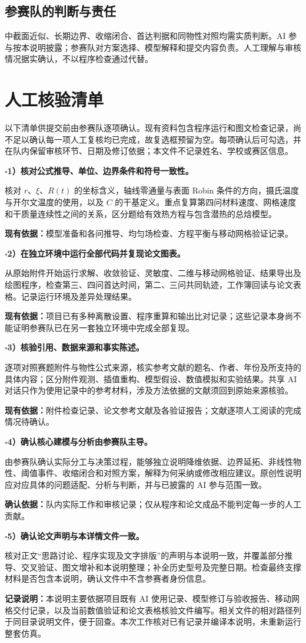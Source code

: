 \documentclass[withoutpreface,bwprint]{commons/cumcmthesis}
\newcommand{\checkitem}[1]{\par\addvspace{0.7em}\noindent$\square$\quad\textbf{#1}\par\nobreak\vspace{0.25em}\nobreak}
\begin{document}
\subsection{参赛队的判断与责任}
中截面近似、长期边界、收缩闭合、首达判据和同物性对照均需实质判断。AI 参与按本说明披露；参赛队对方案选择、模型解释和提交内容负责。人工理解与审核情况据实确认，不以程序检查通过代替。

\section{人工核验清单}
以下清单供提交前由参赛队逐项确认。现有资料包含程序运行和图文检查记录，尚不足以确认每一项人工复核均已完成，故复选框预留为空。每项确认后可勾选，并在队内保留审核环节、日期及修订依据；本文件不记录姓名、学校或赛区信息。

\checkitem{1）核对公式推导、单位、边界条件和符号一致性。}
核对 $r$、$\xi$、$R(t)$ 的坐标含义，轴线零通量与表面 Robin 条件的方向，摄氏温度与开尔文温度的使用，以及 $C$ 的干基定义。重点复算第四问材料速度、网格速度和干质量连续性之间的关系，区分题给有效热方程与包含潜热的总焓模型。

\textbf{现有依据：}模型准备和各问推导、均匀场检查、方程平衡与移动网格验证记录。

\checkitem{2）在独立环境中运行全部代码并复现论文图表。}
从原始附件开始运行求解、收敛验证、灵敏度、二维与移动网格验证、结果导出及绘图程序，检查第三、四问首达时间，第二、三问共同轨迹，工作簿回读与论文表格。记录运行环境及差异处理结果。

\textbf{现有依据：}项目已有多种离散设置、程序重算和输出比对记录；这些记录本身尚不能证明参赛队已在另一套独立环境中完成全部复现。

\checkitem{3）核验引用、数据来源和事实陈述。}
逐项对照赛题附件与物性公式来源，核实参考文献的题名、作者、年份及所支持的具体内容；区分附件观测、插值重构、模型假设、数值模拟和实验结果。共享 AI 对话只作为使用记录中的参考材料，涉及方法依据的文献须回到原始来源核验。

\textbf{现有依据：}附件检查记录、论文参考文献及各验证报告；文献逐项人工阅读的完成情况待确认。

\checkitem{4）确认核心建模与分析由参赛队主导。}
由参赛队确认实际分工与决策过程，能够独立说明降维依据、边界延拓、非线性物性、阈值事件、收缩闭合和对照方案，解释为何采纳或修改相应建议。原创性说明应对应具体的问题适配、分析与判断，并与已披露的 AI 参与范围一致。

\textbf{确认依据：}队内实际工作和审核记录；仅从程序和论文成品不能判定每一步的人工贡献。

\checkitem{5）确认论文声明与本详情文件一致。}
核对正文“思路讨论、程序实现及文字排版”的声明与本说明一致，并覆盖部分推导、交叉验证、图文增补和本说明整理；补全历史型号及完整日期。检查最终支撑材料是否包含本说明，确认文件中不含参赛者身份信息。

\vspace{0.25em}
\textbf{记录说明：}本说明主要依据项目既有 AI 使用记录、模型修订与验收报告、移动网格交付记录，以及当前数值验证和论文表格核验文件编写。相关文件的相对路径列于同目录说明文件，便于回查。本次工作核对已有记录并编译本说明，未重新运行整套仿真。
\end{document}
